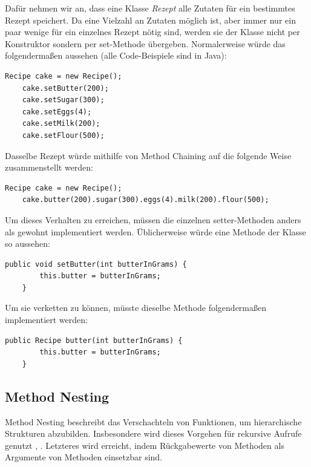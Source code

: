 Dafür nehmen wir an, dass eine Klasse \emph{Rezept} alle Zutaten für ein bestimmtes Rezept speichert. Da eine Vielzahl an Zutaten möglich ist, aber immer nur ein paar wenige für ein einzelnes Rezept nötig sind, werden sie der Klasse nicht per Konstruktor sondern per set-Methode übergeben. Normalerweise würde das folgendermaßen aussehen (alle Code-Beispiele sind in Java):\\

\begin{lstlisting}[caption=Erstellung eines Rezepts auf normale Weise]
	Recipe cake = new Recipe();
	cake.setButter(200);
	cake.setSugar(300);
	cake.setEggs(4);
	cake.setMilk(200);
	cake.setFlour(500);
\end{lstlisting}

\noindent
Dasselbe Rezept würde mithilfe von Method Chaining auf die folgende Weise zusammenstellt werden:\\


\begin{lstlisting}[caption=Erstellung desselben Rezepts mit Method Chaining]
	Recipe cake = new Recipe();
	cake.butter(200).sugar(300).eggs(4).milk(200).flour(500);
\end{lstlisting}

Um dieses Verhalten zu erreichen, müssen die einzelnen setter-Methoden anders als gewohnt implementiert werden. Üblicherweise würde eine Methode der Klasse so aussehen:\\

\begin{lstlisting}[caption=set-Methode in der üblichen Implementierung]
	public void setButter(int butterInGrams) {
		this.butter = butterInGrams;
	}
\end{lstlisting}

Um sie verketten zu können, müsste dieselbe Methode folgendermaßen implementiert werden:\\

\begin{lstlisting}[caption={set-Methode, implementiert zur Aneinaderreihung}]
	public Recipe butter(int butterInGrams) {
		this.butter = butterInGrams;
	}
\end{lstlisting}
\subsection{Method Nesting}\label{ssct:4.1.2:nesting}
Method Nesting beschreibt das Verschachteln von Funktionen, um hierarchische Strukturen abzubilden. Insbesondere wird dieses Vorgehen für rekursive Aufrufe genutzt \cite{book:fowlerDSL}, \cite{vl:drachen:teil3}. Letzteres wird erreicht, indem Rückgabewerte von Methoden als Argumente von Methoden einsetzbar sind.

